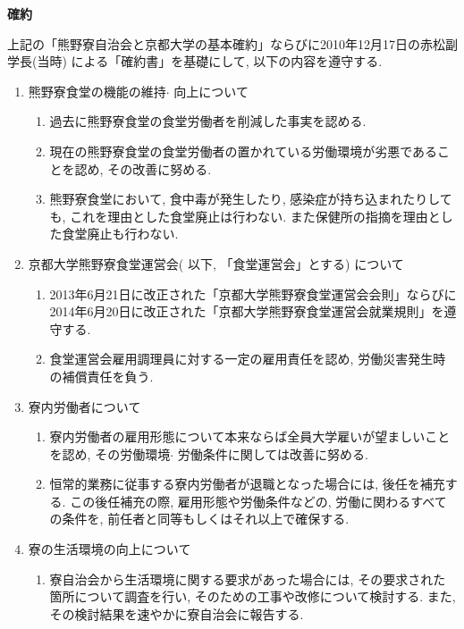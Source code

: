 \documentclass[10pt,b5jsbook,dvips,dvipdfmx,openany]{jsbook}
\theoremstyle{definition}
\begin{document}
		\begin{shadebox}

		\centerline{\bf 確約}

		上記の「熊野寮自治会と京都大学の基本確約」ならびに2010年12月17日の赤松副学長(当時) による「確約書」を基礎にして, 以下の内容を遵守する.

		\begin{enumerate}
 		\renewcommand{\labelenumi}{(\Alph{enumi})}
		\item 熊野寮食堂の機能の維持$ \cdot $ 向上について
			\begin{enumerate}
			\renewcommand{\labelenumii}{(\arabic{enumii})}
			\item 過去に熊野寮食堂の食堂労働者を削減した事実を認める.
			\item 現在の熊野寮食堂の食堂労働者の置かれている労働環境が劣悪であることを認め, その改善に努める.
			\item 熊野寮食堂において, 食中毒が発生したり, 感染症が持ち込まれたりしても, これを理由とした食堂廃止は行わない. また保健所の指摘を理由とした食堂廃止も行わない.
			\end{enumerate}
		\item 京都大学熊野寮食堂運営会( 以下, 「食堂運営会」とする) について
			\begin{enumerate}
			\renewcommand{\labelenumii}{(\arabic{enumii})}
			\item 2013年6月21日に改正された「京都大学熊野寮食堂運営会会則」ならびに2014年6月20日に改正された「京都大学熊野寮食堂運営会就業規則」を遵守する.
			\item 食堂運営会雇用調理員に対する一定の雇用責任を認め, 労働災害発生時の補償責任を負う.
			\end{enumerate}
\item 寮内労働者について
			\begin{enumerate}
			\renewcommand{\labelenumii}{(\arabic{enumii})}
			\item 寮内労働者の雇用形態について本来ならば全員大学雇いが望ましいことを認め, その労働環境$ \cdot $ 労働条件に関しては改善に努める.
			\item 恒常的業務に従事する寮内労働者が退職となった場合には, 後任を補充する. この後任補充の際, 雇用形態や労働条件などの, 労働に関わるすべての条件を, 前任者と同等もしくはそれ以上で確保する.
			\end{enumerate}
		\item 寮の生活環境の向上について
			\begin{enumerate}
			\renewcommand{\labelenumii}{(\arabic{enumii})}
			\item 寮自治会から生活環境に関する要求があった場合には, その要求された箇所について調査を行い, そのための工事や改修について検討する. また, その検討結果を速やかに寮自治会に報告する.

\end{enumerate}
\end{enumerate}
\end{shadebox}
\end{document}
